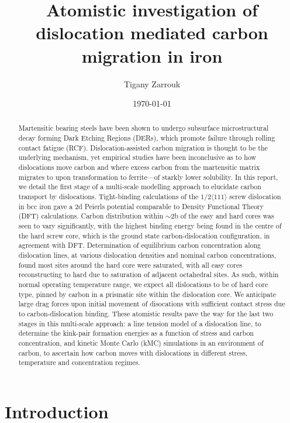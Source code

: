 \documentclass[a4paper,11pt]{article}
\author{Tigany Zarrouk}
\date{\today}
\title{Atomistic investigation of dislocation mediated carbon migration in iron}
\begin{document}
\maketitle
\tableofcontents

\clearpage

\begin{abstract}
Martensitic bearing steels have been shown to undergo subsurface microstructural decay forming
Dark Etching Regions (DERs), which promote failure through rolling contact fatigue
(RCF). Dislocation-assisted carbon migration is thought to be the underlying mechanism, yet
empirical studies have been inconclusive as to how dislocations move carbon and where excess
carbon from the martensitic matrix migrates to upon transformation to ferrite---of starkly lower
solubility. In this report, we detail the first stage of a multi-scale modelling approach to
elucidate carbon transport by dislocations. Tight-binding calculations of the $1/2\langle 111 \rangle$ screw
dislocation in bcc iron gave a 2d Peierls potential comparable to Density Functional Theory (DFT)
calculations. Carbon distribution within $\sim2$b of the easy and hard cores was seen to vary
significantly, with the highest binding energy being found in the centre of the hard screw core,
which is the ground state carbon-dislocation configuration, in agreement with DFT. Determination
of equilibrium carbon concentration along dislocation lines, at various dislocation densities and
nominal carbon concentrations, found most sites around the hard core were saturated, with all easy
cores reconstructing to hard due to saturation of adjacent octahedral sites. As such, within normal
operating temperature range, we expect all dislocations to be of hard core type, pinned by carbon
in a prismatic site within the dislocation core. We anticipate large drag forces upon initial
movement of disocations with sufficient contact stress due to carbon-dislocation binding. These
atomistic results pave the way for the last two stages in this multi-scale approach: a line
tension model of a dislocation line, to determine the kink-pair formation energies as a function
of stress and carbon concentration, and kinetic Monte Carlo (kMC) simulations in an environment of
carbon, to ascertain how carbon moves with dislocations in different stress, temperature and
concentration regimes.

\end{abstract}

\clearpage

\section{Introduction}
\label{sec:org4487ede}
\end{document}
